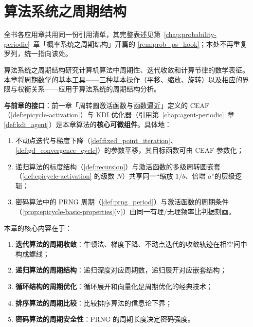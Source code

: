 \chapter{算法系统之周期结构}
\label{chap:algorithm-periodic}

\begin{remark}[本章目标的周期性判定（引用）]\label{rem:algorithm_ps_hook}
全书各应用章共用同一份引用清单，其完整表述见第~\ref{chap:probability-periodic}~章「概率系统之周期结构」开篇的 \cref{rem:prob_ps_hook}；本处不再重复罗列，统一指向该处。
\end{remark}

\begin{definition}\label{def:algorithm_positioning}
算法系统之周期结构研究计算机算法中周期性、迭代收敛和计算节律的数学表征。本章将周期数学的基本工具——三种基本操作（平移、缩放、旋转）以及相应的界限与权衡关系——应用于算法系统的周期结构分析。

\textbf{与前章的接口}：前一章「周转圆激活函数与函数逼近」定义的 CEAF（\cref{def:epicycle-activation}）与 KDI 优化器（引用第~\ref{chap:agent-periodic}~章 \cref{def:kdi_agent}）是本章算法的\textbf{核心可微组件}。具体地：
\begin{enumerate}[label=(\arabic*)]
    \item 不动点迭代与梯度下降（\cref{def:fixed_point_iteration}、\cref{def:gd_convergence_cycle}）的参数平移，其目标函数可由 CEAF 参数化；
    \item 递归算法的标度结构（\cref{def:recursion}）与激活函数的多级周转圆嵌套（\cref{def:epicycle-activation} 的级数 $N$）共享同一“缩放 $1/b$、倍增 $a$”的层级逻辑；
    \item 密码算法中的 PRNG 周期（\cref{def:prng_period}）与激活函数的周期条件（\cref{prop:epicycle-basic-properties}(v)）由同一有理/无理频率比判据刻画。
\end{enumerate}

本章的核心内容在于：
\begin{enumerate}[label=(\arabic*)]
    \item \textbf{迭代算法的周期收敛}：牛顿法、梯度下降、不动点迭代的收敛轨迹在相空间中构成螺线；
    \item \textbf{递归算法的周期结构}：递归深度对应周期数，递归展开对应嵌套结构；
    \item \textbf{循环结构的周期优化}：循环展开和向量化是周期优化的经典技术；
    \item \textbf{排序算法的周期比较}：比较排序算法的信息论下界；
    \item \textbf{密码算法的周期安全性}：PRNG 的周期长度决定密码强度。
\end{enumerate}


\end{definition}
